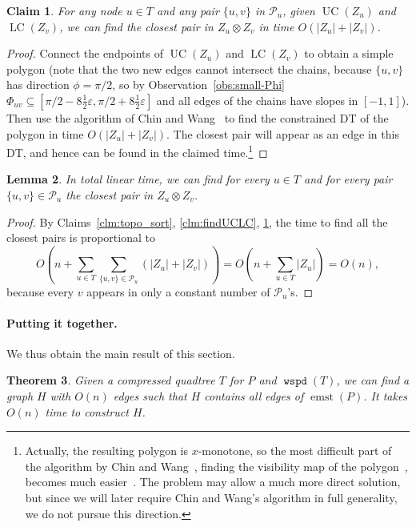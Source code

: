 \documentclass[11pt]{paper}
\newcommand {\eps} {\varepsilon}
\DeclareMathOperator {\wspd}{\texttt{wspd}}
\DeclareMathOperator {\emst}{emst}
\DeclareMathOperator {\UC}{UC}
\DeclareMathOperator {\LC}{LC}
\newtheorem {theorem} {Theorem}[section]
\newtheorem {lem}[theorem] {Lemma}
\newtheorem {claim}[theorem] {Claim}
\begin{document}
\begin{claim}\label{clm:find_closest}
For any node $u \in T$ and any pair $\{u,v\}$ in $\mathcal{P}_u$, given
$\UC(Z_u)$ and $\LC(Z_v)$, we can find the closest pair in $Z_u \otimes Z_v$
in time $O(|Z_u| + |Z_v|)$.
\end{claim}

\begin{proof}
Connect the endpoints of $\UC(Z_u)$ and $\LC(Z_v)$ to obtain a simple
polygon (note that the two new edges cannot intersect the chains,
because $\{u,v\}$ has direction $\phi=\pi/2$,
so by Observation~\ref {obs:small-Phi}
$\Phi_{uv} \subseteq [\pi/2-8\frac12\eps,\pi/2+8\frac12\eps]$
and all edges of the chains have
slopes in $[-1,1]$). Then use the algorithm of Chin and
Wang~\cite{ChinWa99} to find the constrained DT of
the polygon in time $O(|Z_u| + |Z_v|)$. The closest pair will appear
as an edge in this DT, and hence can be found in
the claimed time.\footnote{Actually, the resulting polygon is $x$-monotone,
so the most difficult part of the algorithm by Chin and
Wang~\cite{ChinWa99}, finding the visibility map of the
polygon~\cite{Chazelle91}, becomes much easier~\cite{GareyJoPrTa78}.
The problem may allow a much more direct solution, but since
we will later require Chin and Wang's algorithm in full
generality, we do not pursue this direction.}
\end{proof}

\begin{lem}\label{lem:findNN}
In total linear time, we can find for every $u \in T$ and for
every pair $\{u,v\} \in \mathcal{P}_u$ the closest pair in $Z_u \otimes Z_v$.
\end{lem}

\begin{proof}
By Claims~\ref{clm:topo_sort}, \ref{clm:findUCLC}, \ref{clm:find_closest},
the time to find all the closest pairs is  proportional to
\[
O(n + \sum_{u \in T} \sum_{\{u,v\} \in \mathcal{P}_u} (|Z_u| + |Z_v|))
= O(n + \sum_{u \in T} |Z_u|) = O(n),
\]
because every $v$ appears in only a constant number of $\mathcal{P}_u$'s.
\end{proof}

\paragraph{Putting it together.}
We thus obtain the main result of this section.

\begin{theorem}\label{thm:qtree->h}
Given a compressed quadtree $T$ for $P$ and \emph{$\wspd(T)$}, we can 
find a graph
$H$ with $O(n)$ edges such that $H$ contains all edges of $\emst(P)$.
It takes $O(n)$ time to construct $H$.
\end{theorem}
\end{document}
